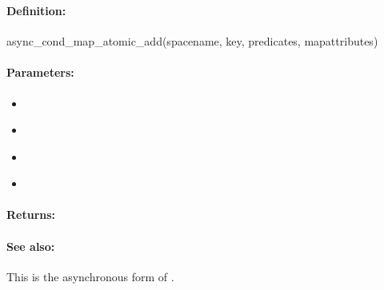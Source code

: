 \pagebreak
\subsubsection{}
\label{api:ruby:async_cond_map_atomic_add}


\paragraph{Definition:}
\begin{rubycode}
async_cond_map_atomic_add(spacename, key, predicates, mapattributes)
\end{rubycode}

\paragraph{Parameters:}
\begin{itemize}[noitemsep]
\item {}\\

\item {}\\

\item {}\\

\item {}\\

\end{itemize}

\paragraph{Returns:}


\paragraph{See also:}  This is the asynchronous form of .

\pagebreak
\subsubsection{}
\label{api:ruby:map_atomic_sub}


